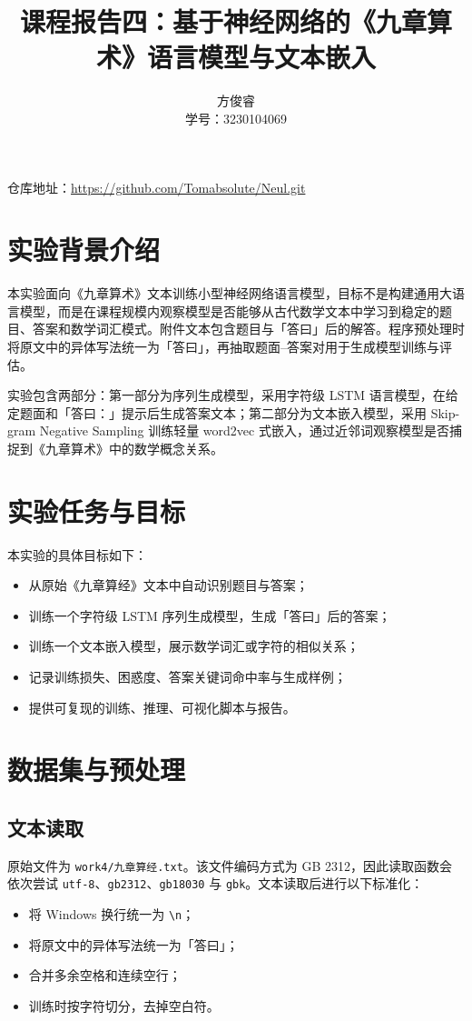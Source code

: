 \documentclass[a4paper,10pt,twocolumn]{article}
\title{课程报告四：基于神经网络的《九章算术》语言模型与文本嵌入}
\author{方俊睿\\学号：3230104069}
\date{}
\begin{document}
\maketitle

\noindent 仓库地址：\url{https://github.com/Tomabsolute/Neul.git}

\section{实验背景介绍}
本实验面向《九章算术》文本训练小型神经网络语言模型，目标不是构建通用大语言模型，而是在课程规模内观察模型是否能够从古代数学文本中学习到稳定的题目、答案和数学词汇模式。附件文本包含题目与「答曰」后的解答。程序预处理时将原文中的异体写法统一为「答曰」，再抽取题面--答案对用于生成模型训练与评估。

实验包含两部分：第一部分为序列生成模型，采用字符级 LSTM 语言模型，在给定题面和「答曰：」提示后生成答案文本；第二部分为文本嵌入模型，采用 Skip-gram Negative Sampling 训练轻量 word2vec 式嵌入，通过近邻词观察模型是否捕捉到《九章算术》中的数学概念关系。

\section{实验任务与目标}
本实验的具体目标如下：
\begin{itemize}
  \item 从原始《九章算经》文本中自动识别题目与答案；
  \item 训练一个字符级 LSTM 序列生成模型，生成「答曰」后的答案；
  \item 训练一个文本嵌入模型，展示数学词汇或字符的相似关系；
  \item 记录训练损失、困惑度、答案关键词命中率与生成样例；
  \item 提供可复现的训练、推理、可视化脚本与报告。
\end{itemize}

\section{数据集与预处理}
\subsection{文本读取}
原始文件为 \texttt{work4/九章算经.txt}。该文件编码方式为 GB 2312，因此读取函数会依次尝试 \texttt{utf-8}、\texttt{gb2312}、\texttt{gb18030} 与 \texttt{gbk}。文本读取后进行以下标准化：
\begin{itemize}
  \item 将 Windows 换行统一为 \texttt{\textbackslash n}；
  \item 将原文中的异体写法统一为「答曰」；
  \item 合并多余空格和连续空行；
  \item 训练时按字符切分，去掉空白符。
\end{itemize}
\end{document}
